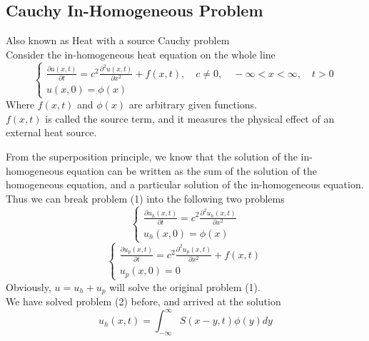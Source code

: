 \documentclass[]{article}
\begin{document}
\setcounter{equation}{0}
\subsection{Cauchy In-Homogeneous Problem}
Also known as Heat with a source Cauchy problem
\\
Consider the in-homogeneous heat equation on the whole line
\begin{equation}
    \begin{cases}
        \displaystyle \frac{\partial u\left(x,t \right)}{\partial t} = c^2 \frac{\partial^2 u(x,t)}{\partial x^2} + f(x,t),\quad c\neq 0,\quad-\infty<x<\infty,\quad t>0
        \\
        u\left(x,0 \right) = \phi\left(x\right)
    \end{cases}
\end{equation}
Where $f(x, t)$ and $\phi(x)$ are arbitrary given functions. 
\\$f(x, t)$ is called the source term, and it measures the physical effect of an external heat source.
\par
From the superposition principle, we know that the solution of the in-homogeneous equation can
be written as the sum of the solution of the homogeneous equation, and a particular solution of the
in-homogeneous equation. 
\\
Thus we can break problem (1) into the following two problems
\begin{equation}
    \begin{cases}
        \displaystyle \frac{\partial u_h\left(x,t \right)}{\partial t} = c^2 \frac{\partial^2 u_h(x,t)}{\partial x^2}
        \\
        u_h\left(x,0 \right) = \phi\left(x\right)
    \end{cases}
\end{equation}
\begin{equation}
    \begin{cases}
        \displaystyle \frac{\partial u_p\left(x,t \right)}{\partial t} = c^2 \frac{\partial^2 u_p(x,t)}{\partial x^2}+ f(x,t)
        \\
        u_p\left(x,0 \right) = 0
    \end{cases}
\end{equation}
Obviously, $u = u_h + u_p$ will solve the original problem (1).
\\
We have solved problem (2) before, and arrived at the solution
\begin{equation}
    u_h(x,t) = \int_{-\infty}^{\infty}S(x-y,t) \phi(y)dy        
\end{equation}
\end{document}
